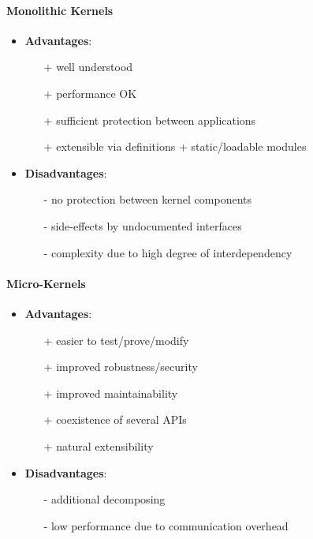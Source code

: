 \paragraph{Monolithic Kernels}
\begin{itemize}
  \item \textbf{Advantages}:
  \begin{itemize}
    \item[+] well understood 
    \item[+] performance OK 
    \item[+] sufficient protection between applications 
    \item[+] extensible via definitions + static/loadable modules
  \end{itemize}
  \item \textbf{Disadvantages}:
  \begin{itemize}
    \item[-] no protection between kernel components 
    \item[-] side-effects by undocumented interfaces 
    \item[-] complexity due to high degree of interdependency
  \end{itemize}
\end{itemize}

\paragraph{Micro-Kernels}
\begin{itemize}
  \item \textbf{Advantages}:
  \begin{itemize}
    \item[+] easier to test/prove/modify 
    \item[+] improved robustness/security 
    \item[+] improved maintainability 
    \item[+] coexistence of several APIs 
    \item[+] natural extensibility   
  \end{itemize} 
  \item \textbf{Disadvantages}:
  \begin{itemize}
    \item[-] additional decomposing 
    \item[-] low performance due to communication overhead
  \end{itemize}
\end{itemize}

